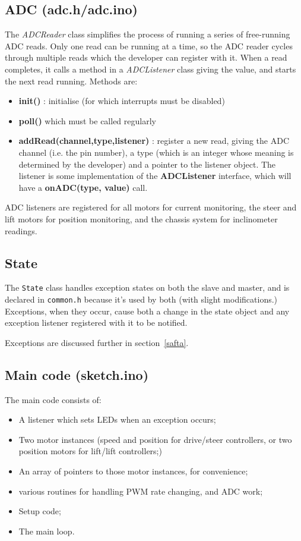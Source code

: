 \subsection{ADC (adc.h/adc.ino)}
The \emph{ADCReader} class simplifies the process of running
a series of free-running ADC reads. Only one read can be running at a time,
so the ADC reader cycles through multiple reads which the developer can register
with it. When a read
completes, it calls a method in a \emph{ADCListener} class
giving the value, and starts the next read running. Methods are:
\begin{itemize}
\item \textbf{init()} : initialise (for which interrupts must be disabled)
\item \textbf{poll()} which must be called regularly
\item \textbf{addRead(channel,type,listener)} : register a new read, giving
the ADC channel (i.e. the pin number), a type (which is an integer whose meaning is determined
by the developer) and a pointer to the listener object. The listener is some implementation of the
\textbf{ADCListener} interface, which will have a \textbf{onADC(type, value)} call.
\end{itemize}
ADC listeners are registered for all motors for current monitoring, the steer and lift motors for
position monitoring, and the chassis system for inclinometer readings.

\subsection{State}
The \texttt{State} class handles exception states on both the slave
and master, and is declared in \texttt{common.h} because it's
used by both (with slight modifications.) Exceptions, when they
occur, cause both a change in the state object and any exception
listener registered with it to be notified.

Exceptions are discussed further in section~\ref{safta}.

\subsection{Main code (sketch.ino)}
The main code consists of:
\begin{itemize}
\item A listener which sets LEDs when an exception occurs;
\item Two motor instances (speed and position for drive/steer controllers, or two position motors for lift/lift 
controllers;)
\item An array of pointers to those motor instances, for convenience;
\item various routines for handling PWM rate changing, and ADC work;
\item Setup code;
\item The main loop.
\end{itemize}
